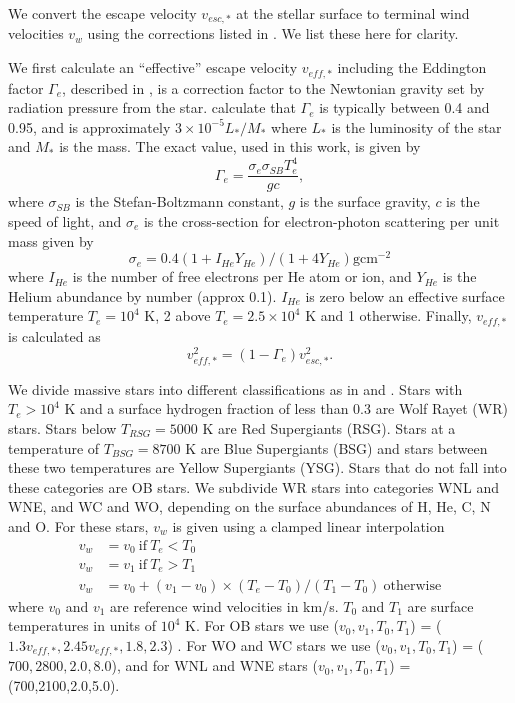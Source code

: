 \documentclass[a4paper,fleqn,usenatbib]{mnras}
\begin{document}
We convert the escape velocity $v_{esc,*}$ at the stellar surface to terminal wind velocities $v_w$ using the corrections listed in \citet{Gatto2017}. We list these here for clarity.

We first calculate an ``effective'' escape velocity $v_{eff,*}$ including the Eddington factor $\Gamma_e$, described in \citet{Lamers1993}, is a correction factor to the Newtonian gravity set by radiation pressure from the star. \citet{Vink2011} calculate that $\Gamma_e$ is typically between 0.4 and 0.95, and is approximately $3\times10^{-5} L_* / M_*$ where $L_*$ is the luminosity of the star and $M_*$ is the mass. The exact value, used in this work, is given by
\begin{equation}
\Gamma_e = \frac{\sigma_e \sigma_{SB} T_e^4}{g c},
\end{equation}
where $\sigma_{SB}$ is the Stefan-Boltzmann constant, $g$ is the surface gravity, $c$ is the speed of light,
 and $\sigma_e$ is the cross-section for electron-photon scattering per unit mass given by
\begin{equation}
\sigma_{e}= 0.4 (1 + I_{He}Y_{He}) / (1 + 4 Y_{He}) \mathrm{g cm}^{-2}
\end{equation}
where $I_{He}$ is the number of free electrons per He atom or ion, and $Y_{He}$  is the Helium abundance by number (approx 0.1). $I_{He}$ is zero below an effective surface temperature $T_e = 10^4$ K, 2 above $T_e = 2.5\times10^4$ K and 1 otherwise. Finally, $v_{eff,*}$ is calculated as
\begin{equation}
v_{eff,*}^2  =  (1 - \Gamma_e) v_{esc,*}^2.
\end{equation}

We divide massive stars into different classifications as in \citet{Crowther2007} and \citet{Georgy2012}. Stars with $T_e > 10^4$ K and a surface hydrogen fraction of less than 0.3 are Wolf Rayet (WR) stars. Stars below $T_{RSG} = 5000$ K are Red Supergiants (RSG). Stars at a temperature of $T_{BSG} = 8700$ K are Blue Supergiants (BSG) and stars between these two temperatures are Yellow Supergiants (YSG). Stars that do not fall into these categories are OB stars. We subdivide WR stars into categories WNL and WNE, and WC and WO, depending on the surface abundances of H, He, C, N and O. For these stars, $v_w$ is given using a clamped linear interpolation
\begin{equation}
\begin{aligned}
v_w &= v_0 \mathrm{~if~} T_e < T_0 \\
v_w &= v_1 \mathrm{~if~} T_e > T_1 \\
v_w &= v_0 + (v_1 - v_0) \times (T_e - T_0) / (T_1 - T_0) \mathrm{~otherwise}
\label{kwind}
\end{aligned}
\end{equation}
where $v_0$ and $v_1$ are reference wind velocities in km/s. $T_0$ and $T_1$ are surface temperatures in units of $10^4$ K. For OB stars we use ($v_0,v_1,T_0,T_1$) = ($1.3 v_{eff,*},2.45 v_{eff,*},1.8,2.3$) . For WO and WC stars we use ($v_0,v_1,T_0,T_1$) = ($700,2800,2.0,8.0$), and for WNL and WNE stars ($v_0,v_1,T_0,T_1$) = (700,2100,2.0,5.0).
\end{document}
